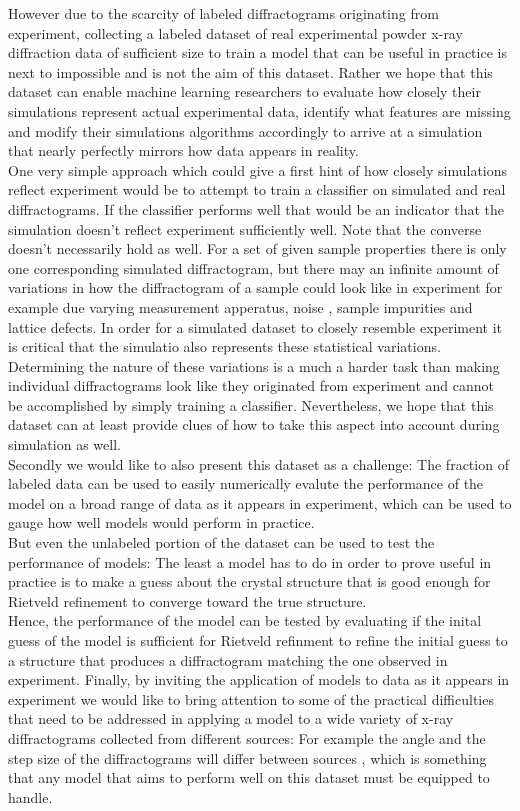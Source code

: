 However due to the scarcity of labeled diffractograms originating from experiment, collecting a labeled dataset
of real experimental powder x-ray diffraction data of sufficient size to train a model
that can be useful in practice is next to impossible and is not the aim of this dataset.
Rather we hope that this dataset can enable machine learning researchers to evaluate how closely their simulations
represent actual experimental data, identify what features are missing and modify their simulations algorithms
accordingly to arrive at a simulation that nearly perfectly mirrors how data appears in reality.\\
One very simple approach which could give a first hint of how closely simulations reflect experiment would be to attempt
to train a classifier on simulated and real diffractograms.
If the classifier performs well that would be an indicator that the simulation doesn't reflect experiment sufficiently well.
Note that the converse doesn't necessarily hold as well.
For a set of given sample properties there is only one corresponding simulated diffractogram, but there may an infinite amount of
variations in how the diffractogram of a sample could look like in experiment for example due varying measurement apperatus, noise
, sample impurities and lattice defects.
In order for a simulated dataset to closely resemble experiment it is critical that the simulatio also represents these
statistical variations.
Determining the nature of these variations is a much a harder task than making individual diffractograms look like they
originated from experiment and cannot be accomplished by simply training a classifier.
Nevertheless, we hope that this dataset can at least provide clues of how to take this aspect into account during
simulation as well.\\

Secondly we would like to also present this dataset as a challenge: The fraction of labeled data can be used to
easily numerically evalute the performance of the model on a broad range of data as it appears in experiment, which can be used
to gauge how well models would perform in practice. \\
But even the unlabeled portion of the dataset can be used to test the performance of models: The least a model
has to do in order to prove useful in practice is to make a guess about the crystal structure that is good enough
for Rietveld refinement to converge toward the true structure. \\
Hence, the performance of the model can be tested by evaluating if the inital guess of the model is sufficient for
Rietveld refinment to refine the initial guess to a structure that produces a diffractogram matching the one observed in experiment.
Finally, by inviting the application of models to data as it appears in experiment we would like to bring attention
to some of the practical difficulties that need to be addressed in applying a model to a wide variety of x-ray diffractograms
collected from different sources: For example the angle and the step size of the diffractograms will differ between sources
, which is something that any model that aims to perform well on this dataset must be equipped to handle.


